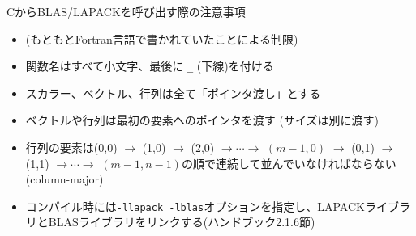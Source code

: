 \begin{frame}[t,fragile]{CからBLAS/LAPACKを呼び出す際の注意事項}
  \begin{itemize}
  \item (もともとFortran言語で書かれていたことによる制限)
  \item 関数名はすべて小文字、最後に \verb+_+ (下線)を付ける
  \item スカラー、ベクトル、行列は全て「ポインタ渡し」とする
  \item ベクトルや行列は最初の要素へのポインタを渡す (サイズは別に渡す)
  \item 行列の要素は(0,0) $\rightarrow$ (1,0) $\rightarrow$ (2,0) $\rightarrow\cdots\rightarrow$ $(m-1,0)$ $\rightarrow$ (0,1) $\rightarrow$ (1,1) $\rightarrow\cdots\rightarrow$ $(m-1,n-1)$の順で連続して並んでいなければならない(column-major)
  \item コンパイル時には{\tt -llapack -lblas}オプションを指定し、LAPACKライブラリとBLASライブラリをリンクする(ハンドブック2.1.6節)
  \end{itemize}
\end{frame}
